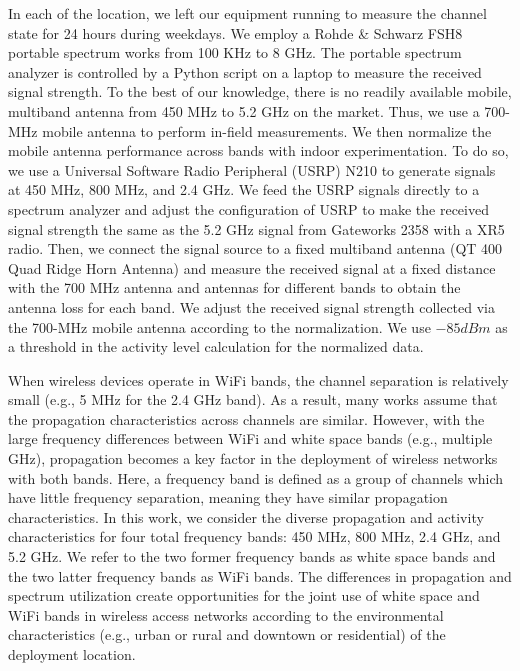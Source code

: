 In each of the location, we left our equipment running to measure the channel state for 24 hours during 
weekdays. 
We employ a Rohde \& Schwarz FSH8 portable spectrum works from 100 KHz to 8 GHz. 
The portable spectrum analyzer is controlled by a Python script on a laptop to measure 
the received signal strength.
To the best of our knowledge, there is no readily available mobile, multiband antenna from
450 MHz to 5.2 GHz on the market. Thus, we use a 700-MHz mobile antenna to perform in-field
measurements. We then normalize the mobile antenna performance across bands with indoor 
experimentation. To do so, we use a Universal Software Radio Peripheral (USRP) N210 to 
generate signals at 450 MHz, 800 MHz, and 2.4 GHz. We feed the USRP signals directly
to a spectrum analyzer and adjust the configuration of USRP to make the received signal 
strength the same as the 5.2 GHz signal from Gateworks 2358 with a XR5 radio. Then, we connect 
the signal source to a fixed multiband antenna (QT 400 Quad Ridge Horn Antenna) and measure the
received signal at a fixed distance with the 700 MHz antenna and antennas for different bands
to obtain the antenna loss for each band. We adjust the received signal strength
collected via the 700-MHz mobile antenna according to the normalization.
We use $-85 dBm$ as a threshold in the activity level calculation for the normalized data.

When wireless devices operate in WiFi bands, the channel separation is relatively 
small (e.g., 5 MHz for the 2.4 GHz band). As a result, many works assume that
the propagation characteristics across channels are similar. However, with the
large frequency differences between WiFi and white space bands (e.g., multiple GHz),
propagation becomes a key factor in the deployment of wireless networks with both bands.
Here, a frequency band is defined as a group of channels which have
little frequency separation, meaning they have similar propagation characteristics.
In this work, we consider the diverse propagation and activity characteristics
for four total frequency bands: 450 MHz, 800 MHz, 2.4 GHz, and 5.2 GHz.
We refer to the two former frequency bands as white space bands and
the two latter frequency bands as WiFi bands.
The differences in propagation and spectrum utilization create opportunities
for the joint use of white space and WiFi bands in wireless access networks according
to the environmental characteristics (e.g., urban or rural and downtown or residential)
of the deployment location.


